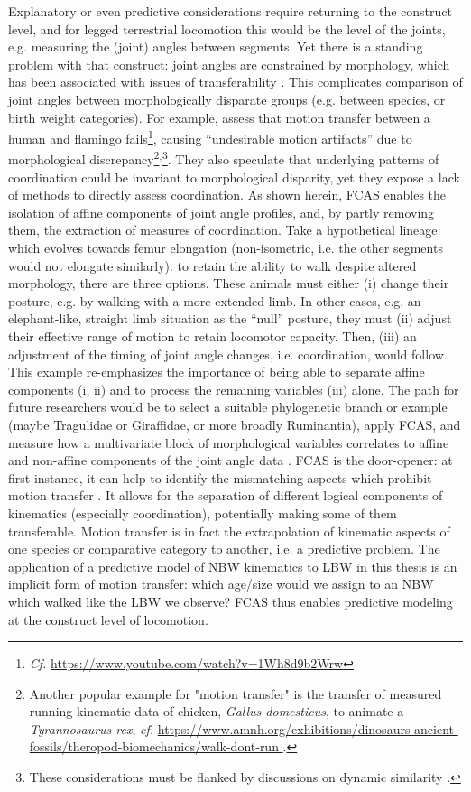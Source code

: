 Explanatory or even predictive considerations require returning to the construct level, and for legged terrestrial locomotion this would be the level of the joints, e.g. measuring the (joint) angles between segments.
Yet there is a standing problem with that construct: joint angles are constrained by morphology, which has been associated with issues of transferability \citep{Gatesy2011}.
This complicates comparison of joint angles between morphologically disparate groups (e.g. between species, or birth weight categories).
For example, \citet{Gatesy2011} assess that motion transfer between a human and flamingo fails\footnote{\textit{Cf.} \url{https://www.youtube.com/watch?v=1Wh8d9b2Wrw}}, causing ``undesirable motion artifacts'' due to morphological discrepancy\footnote{Another popular example for "motion transfer" is the transfer of measured running kinematic data of chicken, \textit{Gallus domesticus}, to animate a \textit{Tyrannosaurus rex}, \textit{cf.} \url{https://www.amnh.org/exhibitions/dinosaurs-ancient-fossils/theropod-biomechanics/walk-dont-run }.}\(^,\)\footnote{These considerations must be flanked by discussions on dynamic similarity \citep{Aerts2023}.}.
They also speculate that underlying patterns of coordination could be invariant to morphological disparity, yet they expose a lack of methods to directly assess coordination.
As shown herein, FCAS enables the isolation of affine components of joint angle profiles, and, by partly removing them, the extraction of measures of coordination.
Take a hypothetical lineage which evolves towards femur elongation (non-isometric, i.e. the other segments would not elongate similarly): to retain the ability to walk despite altered morphology, there are three options.
These animals must either (i) change their posture, e.g. by walking with a more extended limb.
In other cases, e.g. an elephant-like, straight limb situation as the ``null'' posture, they must (ii) adjust their effective range of motion to retain locomotor capacity.
Then, (iii) an adjustment of the timing of joint angle changes, i.e. coordination, would follow.
This example re-emphasizes the importance of being able to separate affine components (i, ii) and to process the remaining variables (iii) alone.
The path for future researchers would be to select a suitable phylogenetic branch or example (maybe Tragulidae or Giraffidae, or more broadly Ruminantia), apply FCAS, and measure how a multivariate block of morphological variables correlates to affine and non-affine components of the joint angle data \citep[a suitable method might be Two-Block Partial Least Squares,][]{Rohlf2000}.
FCAS is the door-opener: at first instance, it can help to identify the mismatching aspects which prohibit motion transfer \citep{Gatesy2011}.
It allows for the separation of different logical components of kinematics (especially coordination), potentially making some of them transferable.
Motion transfer is in fact the extrapolation of kinematic aspects of one species or comparative category to another, i.e. a predictive problem.
The application of a predictive model of NBW kinematics to LBW in this thesis is an implicit form of motion transfer: which age/size would we assign to an NBW which walked like the LBW we observe?
FCAS thus enables predictive modeling at the construct level of locomotion.


